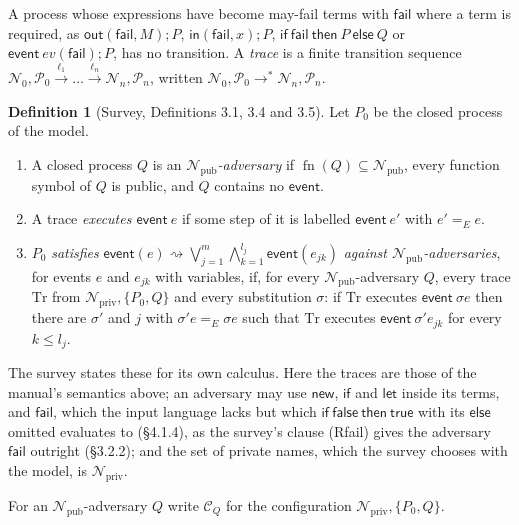 \documentclass[11pt]{article}
\theoremstyle{definition}
\newtheorem{definition}{Definition}[section]
\theoremstyle{plain}
\theoremstyle{remark}
\newcommand{\fn}{\operatorname{fn}}
\begin{document}
A process whose expressions have become may-fail terms with $\mathsf{fail}$ where a term is required, as $\mathsf{out}(\mathsf{fail},M);P$, $\mathsf{in}(\mathsf{fail},x);P$, $\mathsf{if}\ \mathsf{fail}\ \mathsf{then}\ P\ \mathsf{else}\ Q$ or $\mathsf{event}\ ev(\mathsf{fail});P$, has no transition. A \emph{trace} is a finite transition sequence $\mathcal{N}_0,\mathcal{P}_0\xrightarrow{\ell_1}\dots\xrightarrow{\ell_n}\mathcal{N}_n,\mathcal{P}_n$, written $\mathcal{N}_0,\mathcal{P}_0\to^*\mathcal{N}_n,\mathcal{P}_n$.

\begin{definition}[Survey, Definitions 3.1, 3.4 and 3.5]\label{def:survey}
Let $P_0$ be the closed process of the model.
\begin{enumerate}
\item A closed process $Q$ is an \emph{$\mathcal{N}_{\mathrm{pub}}$-adversary} if $\fn(Q)\subseteq\mathcal{N}_{\mathrm{pub}}$, every function symbol of $Q$ is public, and $Q$ contains no $\mathsf{event}$.
\item A trace \emph{executes $\mathsf{event}\ e$} if some step of it is labelled $\mathsf{event}\ e'$ with $e'=_E e$.
\item $P_0$ \emph{satisfies} $\mathsf{event}(e)\rightsquigarrow\bigvee_{j=1}^m\bigwedge_{k=1}^{l_j}\mathsf{event}(e_{jk})$ \emph{against $\mathcal{N}_{\mathrm{pub}}$-adversaries}, for events $e$ and $e_{jk}$ with variables, if, for every $\mathcal{N}_{\mathrm{pub}}$-adversary $Q$, every trace $\mathrm{Tr}$ from $\mathcal{N}_{\mathrm{priv}},\{P_0,Q\}$ and every substitution $\sigma$: if $\mathrm{Tr}$ executes $\mathsf{event}\ \sigma e$ then there are $\sigma'$ and $j$ with $\sigma'e=_E\sigma e$ such that $\mathrm{Tr}$ executes $\mathsf{event}\ \sigma'e_{jk}$ for every $k\le l_j$.
\end{enumerate}
The survey states these for its own calculus. Here the traces are those of the manual's semantics above; an adversary may use $\mathsf{new}$, $\mathsf{if}$ and $\mathsf{let}$ inside its terms, and $\mathsf{fail}$, which the input language lacks but which $\mathsf{if}\ \mathsf{false}\ \mathsf{then}\ \mathsf{true}$ with its $\mathsf{else}$ omitted evaluates to (\S4.1.4), as the survey's clause (Rfail) gives the adversary $\mathsf{fail}$ outright (\S3.2.2); and the set of private names, which the survey chooses with the model, is $\mathcal{N}_{\mathrm{priv}}$.
\end{definition}

For an $\mathcal{N}_{\mathrm{pub}}$-adversary $Q$ write $\mathcal{C}_Q$ for the configuration $\mathcal{N}_{\mathrm{priv}},\{P_0,Q\}$.
\end{document}

